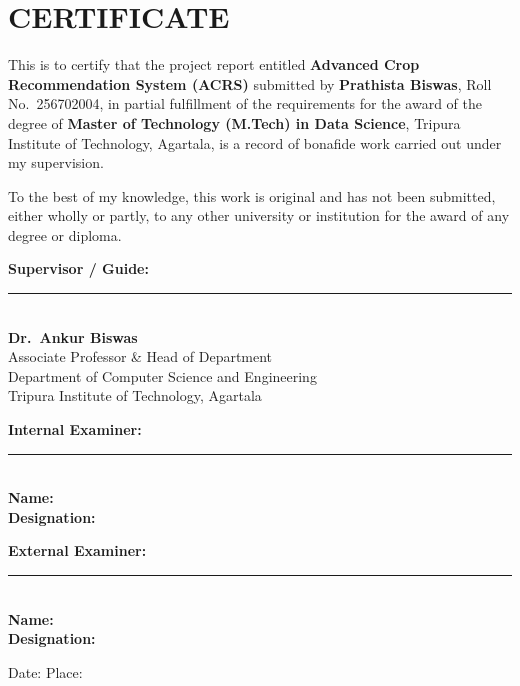 \documentclass[12pt,a4paper,oneside]{report}
\begin{document}
\chapter*{CERTIFICATE}
\begin{singlespacing}
This is to certify that the project report entitled \textbf{Advanced Crop Recommendation System (ACRS)} submitted by \textbf{Prathista Biswas}, Roll No.\ 256702004, in partial fulfillment of the requirements for the award of the degree of \textbf{Master of Technology (M.Tech) in Data Science}, Tripura Institute of Technology, Agartala, is a record of bonafide work carried out under my supervision.

\vspace{0.4cm}
To the best of my knowledge, this work is original and has not been submitted, either wholly or partly, to any other university or institution for the award of any degree or diploma.

\vspace{1.0cm}
\noindent\textbf{Supervisor / Guide:}\\[0.5cm]
\noindent\rule{5cm}{0.4pt}\\[4pt]
\noindent\textbf{Dr.\ Ankur Biswas}\\
Associate Professor \& Head of Department\\
Department of Computer Science and Engineering\\
Tripura Institute of Technology, Agartala

\vspace{0.8cm}
\noindent\textbf{Internal Examiner:}\\[0.5cm]
\noindent\rule{5cm}{0.4pt}\\[4pt]
\noindent\textbf{Name:} \underline{\hspace{5cm}}\\[4pt]
\noindent\textbf{Designation:} \underline{\hspace{4cm}}

\vspace{0.8cm}
\noindent\textbf{External Examiner:}\\[0.5cm]
\noindent\rule{5cm}{0.4pt}\\[4pt]
\noindent\textbf{Name:} \underline{\hspace{5cm}}\\[4pt]
\noindent\textbf{Designation:} \underline{\hspace{4cm}}

\vspace{0.8cm}
\noindent Date: \underline{\hspace{3cm}} \qquad Place: \underline{\hspace{3cm}}
\end{singlespacing}
\newpage
\end{document}
